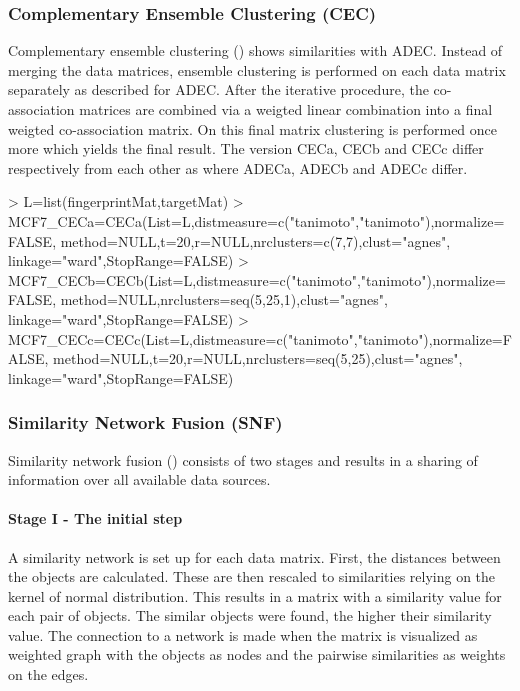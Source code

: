 \documentclass[a4paper]{article}
\begin{document}
\subsubsection{Complementary Ensemble Clustering (CEC)}
Complementary ensemble clustering (\cite{Fodeh2013})
shows similarities with ADEC. Instead of merging the data matrices, ensemble
clustering is performed on each data matrix separately as described for ADEC.
After the iterative procedure, the co-association matrices are combined via a
weigted linear combination into a final weigted co-association matrix. On this
final matrix clustering is performed once more which yields the final result.
The version CECa, CECb and CECc differ respectively from each other as where
ADECa, ADECb and ADECc differ.
\begin{Schunk}
\begin{Sinput}
> L=list(fingerprintMat,targetMat)
> MCF7_CECa=CECa(List=L,distmeasure=c("tanimoto","tanimoto"),normalize=FALSE,
                method=NULL,t=20,r=NULL,nrclusters=c(7,7),clust="agnes",
                linkage="ward",StopRange=FALSE)
> MCF7_CECb=CECb(List=L,distmeasure=c("tanimoto","tanimoto"),normalize=FALSE,
                method=NULL,nrclusters=seq(5,25,1),clust="agnes",
                linkage="ward",StopRange=FALSE) 
> MCF7_CECc=CECc(List=L,distmeasure=c("tanimoto","tanimoto"),normalize=FALSE,
                method=NULL,t=20,r=NULL,nrclusters=seq(5,25),clust="agnes",
                linkage="ward",StopRange=FALSE)		 
\end{Sinput}
\end{Schunk}
\subsubsection{Similarity Network Fusion (SNF)}
Similarity network fusion (\cite{Wang2014}) consists of two stages and results
in a sharing of information over all available data sources.
\paragraph{Stage I - The initial step}
A similarity network is set up for each data matrix. First, the distances
between the objects are calculated. These are then rescaled to similarities
relying on the kernel of normal distribution. This results in a matrix with a
similarity value for each pair of objects. The similar objects were
found, the higher their similarity value. The connection to a network is made
when the matrix is visualized as weighted graph with the objects as nodes and
the pairwise similarities as weights on the edges. 
\end{document}
